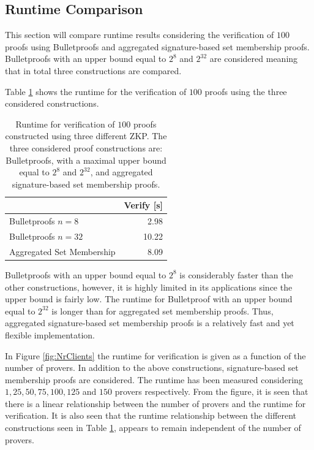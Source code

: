 
\subsection*{Runtime Comparison}
This section will compare runtime results considering the verification of $100$ proofs using Bulletproofs and aggregated signature-based set membership proofs.  Bulletproofs with an upper bound equal to $2^8$ and $2^{32}$ are considered meaning that in total three constructions are compared.

Table \ref{tab:CompareToBulletproof} shows the runtime for the verification of $100$ proofs using the three considered constructions.

\begin{table}
\centering
\begin{tabular}{l | r }
\toprule
	  											& \textbf{Verify} [s]\\	\midrule
  Bulletproofs $n=8$					&   2.98 		\\ 
  Bulletproofs $n=32$					&   10.22 		\\ 
  Aggregated Set Membership	&   8.09 	 \\ 
  \bottomrule 
\end{tabular}
\caption{Runtime for verification of $100$ proofs constructed using three different ZKP. The three considered proof constructions are: Bulletproofs, with a maximal upper bound equal to $2^8$ and $2^{32}$, and aggregated signature-based set membership proofs. }
\label{tab:CompareToBulletproof}
\end{table}

Bulletproofs with an upper bound equal to $2^8$ is considerably faster than the other constructions, however, it is highly limited in its applications since the upper bound is fairly low. The runtime for Bulletproof with an upper bound equal to $2^{32}$ is longer than for aggregated set membership proofs. Thus, aggregated signature-based set membership proofs is a relatively fast and yet flexible implementation. 

In Figure \ref{fig:NrClients} the runtime for verification is given as a function of the number of provers. In addition to the above constructions, signature-based set membership proofs are considered. The runtime has been measured considering  $1,25,50,75,100,125$ and $150$ provers respectively.  From the figure, it is seen that there is a linear relationship between the number of provers and the runtime for verification. It is also seen that the runtime relationship between the different constructions seen in Table \ref{tab:CompareToBulletproof}, appears to remain independent of the number of provers. 

